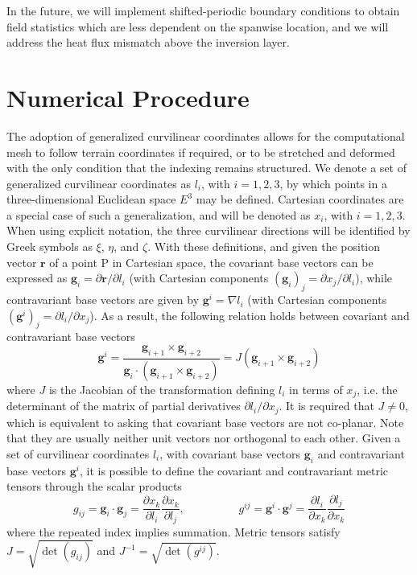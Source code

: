 \documentclass[journal abbreviation, manuscript]{copernicus}
\begin{document}
In the future, we will implement shifted-periodic boundary conditions to obtain field statistics which are less dependent on the spanwise location, and we will address the heat flux mismatch above the inversion layer.  

\newpage
\appendix
\section{Numerical Procedure}
\label{app:numericalProcedure}
The adoption of generalized curvilinear coordinates allows for the computational mesh to follow terrain coordinates if required, or to be stretched and deformed with the only condition that the indexing remains structured. We denote a set of generalized curvilinear coordinates as $l_i$, with $i=1,2,3$, by which points in a three-dimensional Euclidean space $E^3$ may be defined. Cartesian coordinates are a special case of such a generalization, and will be denoted as $x_i$, with $i=1,2,3$. When using explicit notation, the three curvilinear directions will be identified by Greek symbols as $\xi$, $\eta$, and $\zeta$. With these definitions, and given the position vector $\mathbf{r}$ of a point P in Cartesian space, the covariant base vectors can be expressed as $\mathbf{g}_i = \partial\mathbf{r}/\partial l_i$ (with Cartesian components $(\mathbf{g}_i)_j = \partial x_j/\partial l_i$), while contravariant base vectors are given by $\mathbf{g}^i=\nabla l_i$ (with Cartesian components $(\mathbf{g}^i)_j=\partial l_i / \partial x_j$). As a result, the following relation holds between covariant and contravariant base vectors
\begin{equation}
	\mathbf{g}^i = \frac{\mathbf{g}_{i+1}\times \mathbf{g}_{i+2}}{\mathbf{g}_i\cdot(\mathbf{g}_{i+1}\times\mathbf{g}_{i+2})} = J \left( \mathbf{g}_{i+1}\times \mathbf{g}_{i+2}\right) \label{eq:covariantContravariantRelation}
\end{equation}
where $J$ is the Jacobian of the transformation defining $l_i$ in terms of $x_j$, i.e. the determinant of the matrix of partial derivatives $\partial l_i/\partial x_j$. It is required that $J \neq 0$, which is equivalent to asking that covariant base vectors are not co-planar. Note that they are usually neither unit vectors nor orthogonal to each other. Given a set of curvilinear coordinates $l_i$, with covariant base vectors $\mathbf{g}_i$ and contravariant base vectors $\mathbf{g}^i$, it is possible to define the covariant and contravariant metric tensors through the scalar products 
\begin{equation}
	g_{ij} = \mathbf{g}_i \cdot \mathbf{g}_j = \frac{\partial x_k}{\partial l_i}\frac{\partial x_k}{\partial l_j}, \hspace{2cm} g^{ij} = \mathbf{g}^i \cdot \mathbf{g}^j = \frac{\partial l_i}{\partial x_k}\frac{\partial l_j}{\partial x_k} \label{eq:metricTensors} 
\end{equation}
where the repeated index implies summation. Metric tensors satisfy  $J = \sqrt{\det(g_{ij})}$ and $J^{-1} = \sqrt{\det(g^{ij})}$. 
\end{document}
